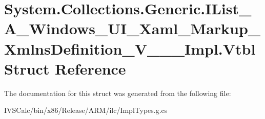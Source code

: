 \hypertarget{struct_system_1_1_collections_1_1_generic_1_1_i_list___a___windows___u_i___xaml___markup___xmlns42db6752102d93460d4c9945b146b950}{}\section{System.\+Collections.\+Generic.\+I\+List\+\_\+\+A\+\_\+\+Windows\+\_\+\+U\+I\+\_\+\+Xaml\+\_\+\+Markup\+\_\+\+Xmlns\+Definition\+\_\+\+V\+\_\+\+\_\+\+\_\+\+Impl.\+Vtbl Struct Reference}
\label{struct_system_1_1_collections_1_1_generic_1_1_i_list___a___windows___u_i___xaml___markup___xmlns42db6752102d93460d4c9945b146b950}


The documentation for this struct was generated from the following file\+:\begin{DoxyCompactItemize}
\item 
I\+V\+S\+Calc/bin/x86/\+Release/\+A\+R\+M/ilc/Impl\+Types.\+g.\+cs\end{DoxyCompactItemize}
